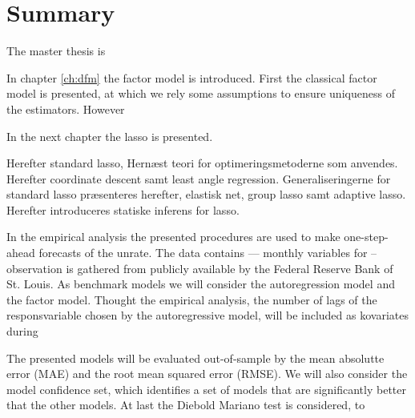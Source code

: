 \chapter{Summary}
The master thesis is 


In chapter \ref{ch:dfm} the factor model is introduced.
First the classical factor model is presented, at which we rely some assumptions to ensure uniqueness of the estimators.
However 

In the next chapter the lasso is presented.  

Herefter standard lasso,
Hernæst teori for optimeringsmetoderne som anvendes.
Herefter coordinate descent samt least angle regression.
Generaliseringerne for standard lasso præsenteres herefter, elastisk net, group lasso samt adaptive lasso.
Herefter introduceres statiske inferens for lasso.

In the empirical analysis the presented procedures are used to make one-step-ahead forecasts of the unrate.
The data contains --- monthly variables for -- observation is gathered from publicly available by the Federal Reserve Bank of St. Louis.
As benchmark models we will consider the autoregression model and the factor model.
Thought the empirical analysis, the number of lags of the responsvariable chosen by the autoregressive model, will be included as kovariates during  

The presented models will be evaluated out-of-sample by the mean absolutte error (MAE) and the root mean squared error (RMSE).
We will also consider the model confidence set, which identifies a set of models that are significantly better that the other models.
At last the Diebold Mariano test is considered, to 
